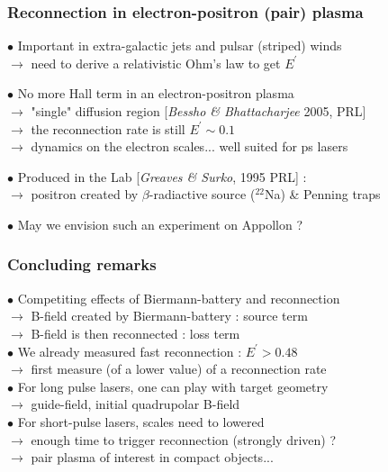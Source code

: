 \documentclass{beamer}
\begin{document}
\begin{frame}
\frametitle{Reconnection in electron-positron (pair) plasma}

$\bullet$ Important in extra-galactic jets and pulsar (striped) winds \\
$\to$ need to derive a relativistic Ohm's law to get $E^{\prime}$ \\

\bigskip

$\bullet$ No more Hall term in an electron-positron plasma\\
$\to$ "single" diffusion region [\textit{Bessho \& Bhattacharjee} 2005, PRL] \\
$\to$ the reconnection rate is still $E^{\prime} \sim 0.1$ \\
$\to$ dynamics on the electron scales... well suited for ps lasers \\

\bigskip

$\bullet$ Produced in the Lab [\textit{Greaves \& Surko}, 1995 PRL] :\\
$\to$ positron created by $\beta$-radiactive source ($^{22}$Na) \& Penning traps \\

\bigskip

$\bullet$ May we envision such an experiment on Appollon ?

\end{frame}



\begin{frame}
\frametitle{Concluding remarks}

$\bullet$ Competiting effects of Biermann-battery and reconnection \\
$\to$ B-field created by Biermann-battery : source term \\
$\to$ B-field is then reconnected : loss term \\[0.6cm]

$\bullet$ We already measured fast reconnection : $E^{\prime} > 0.48$ \\
$\to$ first measure (of a lower value) of a reconnection rate \\[0.6cm]

$\bullet$ For long pulse lasers, one can play with target geometry \\
$\to$ guide-field, initial quadrupolar B-field \\[0.6cm]

$\bullet$ For short-pulse lasers, scales need to lowered \\
$\to$ enough time to trigger reconnection (strongly driven) ? \\
$\to$ pair plasma of interest in compact objects... \\

\end{frame}
\end{document}
